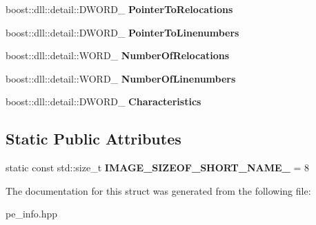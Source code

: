 \begin{DoxyCompactItemize}
\item 
boost\+::dll\+::detail\+::\+D\+W\+O\+R\+D\+\_\+ {\bfseries Pointer\+To\+Relocations}\hypertarget{a00150_abd4b898e8d8100a7b9136deaa0a707ed}{}\label{a00150_abd4b898e8d8100a7b9136deaa0a707ed}

\item 
boost\+::dll\+::detail\+::\+D\+W\+O\+R\+D\+\_\+ {\bfseries Pointer\+To\+Linenumbers}\hypertarget{a00150_ae07e5d087d87b2c974c2240e588969c9}{}\label{a00150_ae07e5d087d87b2c974c2240e588969c9}

\item 
boost\+::dll\+::detail\+::\+W\+O\+R\+D\+\_\+ {\bfseries Number\+Of\+Relocations}\hypertarget{a00150_a4ec45186d4ed93d26d49a2be0e91e486}{}\label{a00150_a4ec45186d4ed93d26d49a2be0e91e486}

\item 
boost\+::dll\+::detail\+::\+W\+O\+R\+D\+\_\+ {\bfseries Number\+Of\+Linenumbers}\hypertarget{a00150_a1de6e8291c2d0c56d23121a6c7aaaaa3}{}\label{a00150_a1de6e8291c2d0c56d23121a6c7aaaaa3}

\item 
boost\+::dll\+::detail\+::\+D\+W\+O\+R\+D\+\_\+ {\bfseries Characteristics}\hypertarget{a00150_ac240795840b159ec9fe624eae3969314}{}\label{a00150_ac240795840b159ec9fe624eae3969314}

\end{DoxyCompactItemize}
\subsection*{Static Public Attributes}
\begin{DoxyCompactItemize}
\item 
static const std\+::size\+\_\+t {\bfseries I\+M\+A\+G\+E\+\_\+\+S\+I\+Z\+E\+O\+F\+\_\+\+S\+H\+O\+R\+T\+\_\+\+N\+A\+M\+E\+\_\+} = 8\hypertarget{a00150_ac5eb10907f703acc027687205c5a975f}{}\label{a00150_ac5eb10907f703acc027687205c5a975f}

\end{DoxyCompactItemize}


The documentation for this struct was generated from the following file\+:\begin{DoxyCompactItemize}
\item 
pe\+\_\+info.\+hpp\end{DoxyCompactItemize}
